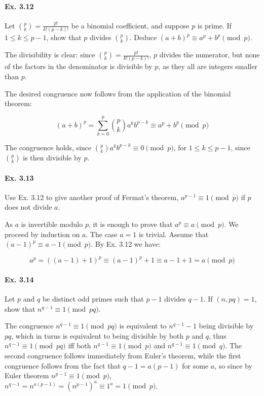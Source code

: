 \documentclass[notitlepage]{article}
\theoremstyle{definition}
\begin{document}
\paragraph{Ex. 3.12}
Let ${p \choose k} = \frac{p!}{k!(p-k)!}$ be a binomial coefficient,
and suppose $p$ is prime. If $1 \leq k \leq p-1$, show that $p$
divides ${p \choose k}$. Deduce $(a+b)^p \equiv a^p + b^p \pmod p$.

The divisibility is clear: since ${p \choose k} =
\frac{p!}{k!(p-k)!}$, $p$ divides the numerator, but none of the
factors in the denominator is divisible by $p$, as they all are
integers smaller than $p$.

The desired congruence now follows from the application of the
binomial theorem:

\begin{equation}
  (a+b)^p = \sum_{k=0}^p {p \choose k} a^k b^{p-k} \equiv a^p + b^p \pmod p
\end{equation}

The congruence holds, since ${p \choose k} a^k b^{p-k} \equiv 0 \pmod
p$, for $1 \leq k \leq p-1$, since ${p \choose k}$ is then divisible
by $p$.

\paragraph{Ex. 3.13}
Use Ex. 3.12 to give another proof of Fermat's theorem, $a^{p-1}
\equiv 1 \pmod p$ if $p$ does not divide $a$.

As $a$ is invertible modulo $p$, it is enough to prove that $a^p
\equiv a \pmod p$. We proceed by induction on $a$. The case $a = 1$ is
trivial. Assume that $(a-1)^p \equiv a-1 \pmod p$. By Ex. 3.12 we have:

\begin{equation}
  a^p = ((a-1)+1)^p \equiv (a-1)^p + 1 \equiv a-1 + 1 = a \pmod p
\end{equation}

\paragraph{Ex. 3.14}
Let $p$ and $q$ be distinct odd primes such that $p - 1$ divides $q -
1$. If $(n, pq) = 1$, show that $n^{q - 1} \equiv 1 \pmod {pq}$.

The congruence $n^{q - 1} \equiv 1 \pmod {pq}$ is equivalent to
$n^{q-1} - 1$ being divisible by $pq$, which in turns is equivalent to
being divisible by both $p$ and $q$, thus $n^{q - 1} \equiv 1 \pmod
{pq}$ iff both $n^{q - 1} \equiv 1 \pmod {p}$ and $n^{q - 1} \equiv 1
\pmod {q}$. The second congruence follows immediately from Euler's
theorem, while the first congruence follows from the fact that $q-1 =
a(p-1)$ for some $a$, so since by Euler theorem $n^{p-1} \equiv 1
\pmod p$, $n^{q-1} = n^{a(p-1)} = (n^{p-1})^a \equiv 1^a = 1 \pmod p$.
\end{document}
